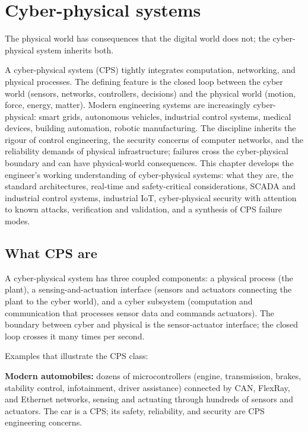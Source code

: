 \chapter{Cyber-physical systems}
\label{vol09:ch14}

\epigraph{The physical world has consequences that the digital world does not; the cyber-physical system inherits both.}{}


\noindent
A cyber-physical system (CPS) tightly integrates computation, networking, and physical processes. The defining feature is the closed loop between the cyber world (sensors, networks, controllers, decisions) and the physical world (motion, force, energy, matter). Modern engineering systems are increasingly cyber-physical: smart grids, autonomous vehicles, industrial control systems, medical devices, building automation, robotic manufacturing. The discipline inherits the rigour of control engineering, the security concerns of computer networks, and the reliability demands of physical infrastructure; failures cross the cyber-physical boundary and can have physical-world consequences. This chapter develops the engineer's working understanding of cyber-physical systems: what they are, the standard architectures, real-time and safety-critical considerations, SCADA and industrial control systems, industrial IoT, cyber-physical security with attention to known attacks, verification and validation, and a synthesis of CPS failure modes.

\section{What CPS are}

A cyber-physical system has three coupled components: a physical process (the plant), a sensing-and-actuation interface (sensors and actuators connecting the plant to the cyber world), and a cyber subsystem (computation and communication that processes sensor data and commands actuators). The boundary between cyber and physical is the sensor-actuator interface; the closed loop crosses it many times per second.

Examples that illustrate the CPS class:

\textbf{Modern automobiles:} dozens of microcontrollers (engine, transmission, brakes, stability control, infotainment, driver assistance) connected by CAN, FlexRay, and Ethernet networks, sensing and actuating through hundreds of sensors and actuators. The car is a CPS; its safety, reliability, and security are CPS engineering concerns.

